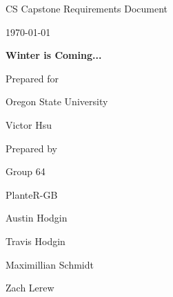 \documentclass[onecolumn, draftclsnofoot,10pt, compsoc]{IEEEtran}
\def \CapstoneTeamName{			              			 PlanteR-GB}
\def \CapstoneTeamNumber{					           			 Group 64}
\def \GroupMemberOne{				           				Austin Hodgin}
\def \GroupMemberTwo{				           				Travis Hodgin}
\def \GroupMemberThree{			            Maximillian Schmidt}
\def\GroupMemberFour{		        	               Zach Lerew}
\def \CapstoneProjectName{	      	    Winter is Coming...}
\def \CapstoneSponsorCompany{		    Oregon State University}
\def \CapstoneSponsorPerson{		 			  				 Victor Hsu}
\def \DocType{		%
				Requirements Document
				}
\newcommand{\NameSigPair}[1]{\par
\makebox[2.75in][r]{#1} \hfil 	\makebox[3.25in]{\makebox[2.25in]{\hrulefill} \hfill		\makebox[.75in]{\hrulefill}}
\par\vspace{-12pt} \textit{\tiny\noindent
\makebox[2.75in]{} \hfil		\makebox[3.25in]{\makebox[2.25in][r]{Signature} \hfill	\makebox[.75in][r]{Date}}}}
\renewcommand{\NameSigPair}[1]{#1}
\begin{document}
\begin{titlepage}
    \begin{singlespace}
        \hfill


        \par\vspace{.2in}
        \centering
        \scshape{
            \huge CS Capstone \DocType \par
            {\large\today}\par
            \vspace{.5in}
            \textbf{\Huge\CapstoneProjectName}\par

						\vspace{1in}

            {\large Prepared for}\par
            \Huge \CapstoneSponsorCompany\par
            \vspace{5pt}
            {\Large\NameSigPair{\CapstoneSponsorPerson}\par}

						\vspace{1in}

            {\large Prepared by}\par
						{\huge \CapstoneTeamNumber}\par
            \CapstoneTeamName\par
            \vspace{5pt}

            {
							\Large
							\NameSigPair{\GroupMemberOne}\par
							\NameSigPair{\GroupMemberTwo}\par
							\NameSigPair{\GroupMemberThree}\par
							\NameSigPair{\GroupMemberFour}\par
            }

            \vspace{20pt}
        }
				\newpage
        \begin{abstract}
				\noindent This project will create a system that controls RGB LEDs responsible for indoor plant growth during the cold seasons.
				Seasonal weather conditions may vary between different parts of the world, but plant growth becomes especially difficult during the fall and winter months.
				Oregon is an exceptional case of this rule. The state's winter season produces a hostile growth environment for plants such as herbs, spices, and decorative flowers.
				Plants like these are not able to survive the cold, dark, and humid Oregon weather.


\end{abstract}
\end{singlespace}
\end{titlepage}
\end{document}
